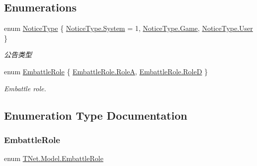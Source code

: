 \subsection*{Enumerations}
\begin{DoxyCompactItemize}
\item 
enum \mbox{\hyperlink{namespace_t_net_1_1_model_a84a982245a4f84ccbdcd9cb3763269b6}{Notice\+Type}} \{ \mbox{\hyperlink{namespace_t_net_1_1_model_a84a982245a4f84ccbdcd9cb3763269b6aa45da96d0bf6575970f2d27af22be28a}{Notice\+Type.\+System}} = 1, 
\mbox{\hyperlink{namespace_t_net_1_1_model_a84a982245a4f84ccbdcd9cb3763269b6a63d72051e901c069f8aa1b32aa0c43bb}{Notice\+Type.\+Game}}, 
\mbox{\hyperlink{namespace_t_net_1_1_model_a84a982245a4f84ccbdcd9cb3763269b6a8f9bfe9d1345237cb3b2b205864da075}{Notice\+Type.\+User}}
 \}
\begin{DoxyCompactList}\small\item\em 公告类型 \end{DoxyCompactList}\item 
enum \mbox{\hyperlink{namespace_t_net_1_1_model_a33d7abaa523c3472da9f2084152b79d3}{Embattle\+Role}} \{ \mbox{\hyperlink{namespace_t_net_1_1_model_a33d7abaa523c3472da9f2084152b79d3ae9617e9d694be2edc27b0fbf1ba04d06}{Embattle\+Role.\+RoleA}}, 
\mbox{\hyperlink{namespace_t_net_1_1_model_a33d7abaa523c3472da9f2084152b79d3a86f0d447464f89b6875f02485fe807ce}{Embattle\+Role.\+RoleD}}
 \}
\begin{DoxyCompactList}\small\item\em Embattle role. \end{DoxyCompactList}\end{DoxyCompactItemize}


\subsection{Enumeration Type Documentation}
\mbox{\label{namespace_t_net_1_1_model_a33d7abaa523c3472da9f2084152b79d3}} 
\subsubsection{\texorpdfstring{Embattle\+Role}{EmbattleRole}}
{\footnotesize\ttfamily enum \mbox{\hyperlink{namespace_t_net_1_1_model_a33d7abaa523c3472da9f2084152b79d3}{T\+Net.\+Model.\+Embattle\+Role}}\hspace{0.3cm}{\ttfamily [strong]}}



